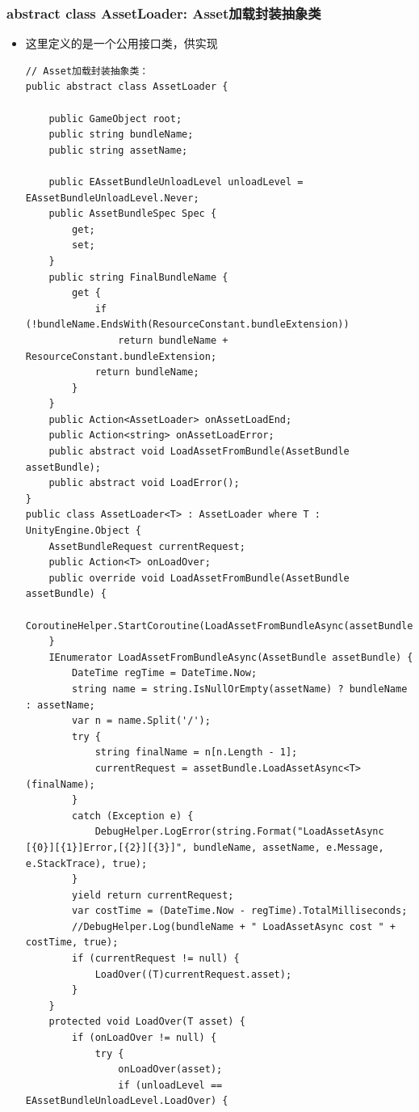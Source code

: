 \documentclass[9pt, b5paper]{article}
\begin{document}
\subsubsection{abstract class AssetLoader: Asset加载封装抽象类}
\label{sec-7-1-1}
\begin{itemize}
\item 这里定义的是一个公用接口类，供实现
\begin{verbatim}
// Asset加载封装抽象类：  
public abstract class AssetLoader {

    public GameObject root;
    public string bundleName;
    public string assetName;

    public EAssetBundleUnloadLevel unloadLevel = EAssetBundleUnloadLevel.Never;
    public AssetBundleSpec Spec {
        get;
        set;
    }
    public string FinalBundleName {
        get {
            if (!bundleName.EndsWith(ResourceConstant.bundleExtension))
                return bundleName + ResourceConstant.bundleExtension;
            return bundleName;
        }
    }
    public Action<AssetLoader> onAssetLoadEnd;
    public Action<string> onAssetLoadError;
    public abstract void LoadAssetFromBundle(AssetBundle assetBundle);
    public abstract void LoadError();
}
public class AssetLoader<T> : AssetLoader where T : UnityEngine.Object {
    AssetBundleRequest currentRequest;
    public Action<T> onLoadOver;
    public override void LoadAssetFromBundle(AssetBundle assetBundle) {
        CoroutineHelper.StartCoroutine(LoadAssetFromBundleAsync(assetBundle));
    }
    IEnumerator LoadAssetFromBundleAsync(AssetBundle assetBundle) {
        DateTime regTime = DateTime.Now;
        string name = string.IsNullOrEmpty(assetName) ? bundleName : assetName;
        var n = name.Split('/');
        try {
            string finalName = n[n.Length - 1];
            currentRequest = assetBundle.LoadAssetAsync<T>(finalName);
        }
        catch (Exception e) {
            DebugHelper.LogError(string.Format("LoadAssetAsync [{0}][{1}]Error,[{2}][{3}]", bundleName, assetName, e.Message, e.StackTrace), true);
        }
        yield return currentRequest;
        var costTime = (DateTime.Now - regTime).TotalMilliseconds;
        //DebugHelper.Log(bundleName + " LoadAssetAsync cost " + costTime, true);
        if (currentRequest != null) {
            LoadOver((T)currentRequest.asset);
        }
    }
    protected void LoadOver(T asset) {
        if (onLoadOver != null) {
            try {
                onLoadOver(asset);
                if (unloadLevel == EAssetBundleUnloadLevel.LoadOver) {

\end{verbatim}
\end{itemize}
\end{document}
